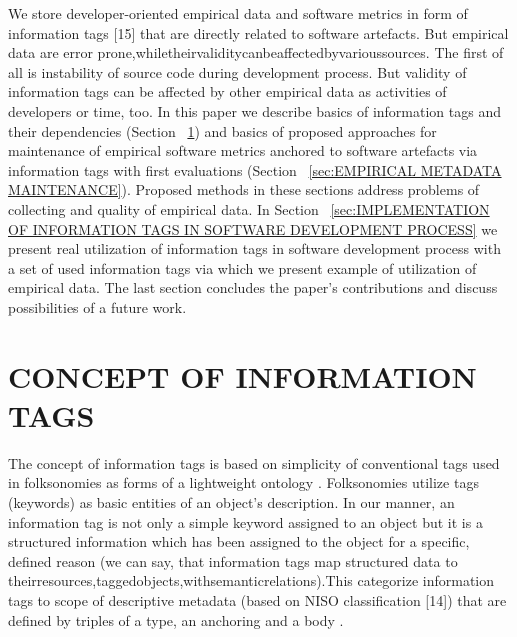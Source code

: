 \documentclass[18px,a4, conference]{IEEEtran}
\begin{document}
 We store developer-oriented empirical data and software metrics in form of information tags [15] that are directly related to software artefacts. But empirical data are error prone,whiletheirvaliditycanbeaffectedbyvarioussources. The ﬁrst of all is instability of source code during development process. But validity of information tags can be affected by other empirical data as activities of developers or time, too. In this paper we describe basics of information tags and their dependencies (Section ~\ref{sec:CONCEPT OF INFORMATION TAGS}) and basics of proposed approaches for maintenance of empirical software metrics anchored to software artefacts via information tags with ﬁrst evaluations (Section ~\ref{sec:EMPIRICAL METADATA MAINTENANCE}). Proposed methods in these sections address problems of collecting and quality of empirical data. In Section ~\ref{sec:IMPLEMENTATION OF INFORMATION TAGS IN SOFTWARE DEVELOPMENT PROCESS} we present real utilization of information tags in software development process with a set of used information tags via which we present example of utilization of empirical data. The last section concludes the paper’s contributions and discuss possibilities of a future work.                                                           %
\section{CONCEPT OF INFORMATION TAGS}
\label{sec:CONCEPT OF INFORMATION TAGS}


The concept of information tags is based on simplicity of conventional tags used in folksonomies as forms of a lightweight ontology \cite{giunchiglia2009lightweight}. Folksonomies utilize tags (keywords) as basic entities of an object’s description. In our manner, an information tag is not only a simple keyword assigned to an object but it is a structured information which has been assigned to the object for a speciﬁc, deﬁned reason (we can say, that information tags map structured data to theirresources,taggedobjects,withsemanticrelations).This categorize information tags to scope of descriptive metadata (based on NISO classiﬁcation [14]) that are deﬁned by triples of a type, an anchoring and a body \cite{Bieliková2012}.
\end{document}
